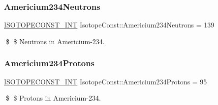 \subsubsection{\texorpdfstring{Americium234\+Neutrons}{Americium234Neutrons}}
{\footnotesize\ttfamily \mbox{\hyperlink{group___isotope_const-_macros_ga5f18360b3e99483a35c32d789e62621c}{I\+S\+O\+T\+O\+P\+E\+C\+O\+N\+S\+T\+\_\+\+I\+NT}} Isotope\+Const\+::\+Americium234\+Neutrons = 139}

\$ \$ Neutrons in Americium-\/234. \mbox{\label{group___isotope_const-_americium-_am234_ga44cf41b2825814b66c485ffac69d0388}} 
\subsubsection{\texorpdfstring{Americium234\+Protons}{Americium234Protons}}
{\footnotesize\ttfamily \mbox{\hyperlink{group___isotope_const-_macros_ga5f18360b3e99483a35c32d789e62621c}{I\+S\+O\+T\+O\+P\+E\+C\+O\+N\+S\+T\+\_\+\+I\+NT}} Isotope\+Const\+::\+Americium234\+Protons = 95}

\$ \$ Protons in Americium-\/234. 